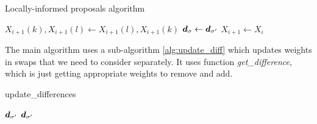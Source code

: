 \begin{algorithm}[!htb]
			\caption{Locally-informed proposals algorithm}\label{alg:loc_neigh}
			\begin{algorithmic}[1]
				
					
					
					
						\State $X_{i+1}(k), X_{i+1}(l) \gets X_{i+1}(l), X_{i+1}(k)$
						\State $\bm{d}_{\sigma} \gets \bm{d}_{\sigma'}$
					\Else
						\State $X_{i+1} \gets X_i$
					\EndIf
				\EndFor
			\end{algorithmic}
		\end{algorithm}
		
		The main algorithm uses a sub-algorithm \ref{alg:update_diff} which updates weights in swaps that we need to consider separately. It uses function \textit{get\_difference}, which is just getting appropriate weights to remove and add. 
		\begin{algorithm}[!htb]
			\caption{update\_differences}\label{alg:update_diff}
			\begin{algorithmic}[1]
				\Require $\bm{d}_{\sigma'}$
				\Ensure $\bm{d}_{\sigma'}$
						\EndIf
					\EndFor
				\EndFor
			\end{algorithmic}
		\end{algorithm}